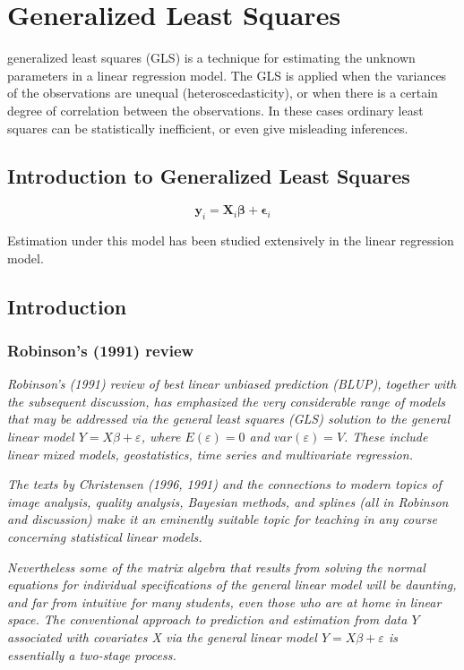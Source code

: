 \documentclass[12pt, a4paper]{article}
\begin{document}
\section{Generalized Least Squares}


 generalized least squares (GLS) is a technique for estimating the unknown parameters in a linear regression model. 
 The GLS is applied when the variances of the observations are unequal (heteroscedasticity), or when there is a certain degree of correlation between the observations. 
 In these cases ordinary least squares can be statistically inefficient, or even give misleading inferences.


\subsection{Introduction to Generalized Least Squares}
 \begin{equation}
 \boldsymbol{y}_i = \boldsymbol{X}_i\boldsymbol{\beta} + \boldsymbol{\epsilon}_i
 \end{equation}

Estimation under this model has been studied extensively in the linear regression model.

\newpage

\subsection{Introduction}
\subsubsection{Robinson's (1991) review}
\emph{ Robinson's (1991) review of best linear unbiased prediction (BLUP), together with the subsequent discussion, has emphasized the very considerable range of models that may be addressed via the general least squares (GLS) solution to the general linear model $Y = X\beta + \varepsilon$, where $E(\varepsilon) = 0$ and $var(\varepsilon) = V$. These include linear mixed models, geostatistics, time series and multivariate regression.}


\emph{ The texts by Christensen (1996, 1991) and the connections to modern topics of image analysis, quality analysis, Bayesian methods, and splines (all in Robinson and discussion) make it an eminently suitable topic for teaching in any course concerning statistical linear models. }


\emph{Nevertheless some of the matrix algebra that results from solving the normal equations for individual specifications of the general linear model will be daunting, and far from intuitive for many students, even those who are at home in linear space. The conventional approach to prediction and estimation from data $Y$ associated with covariates X via the general linear model $Y = X\beta + \varepsilon$ is essentially a two-stage process.}
\end{document}
